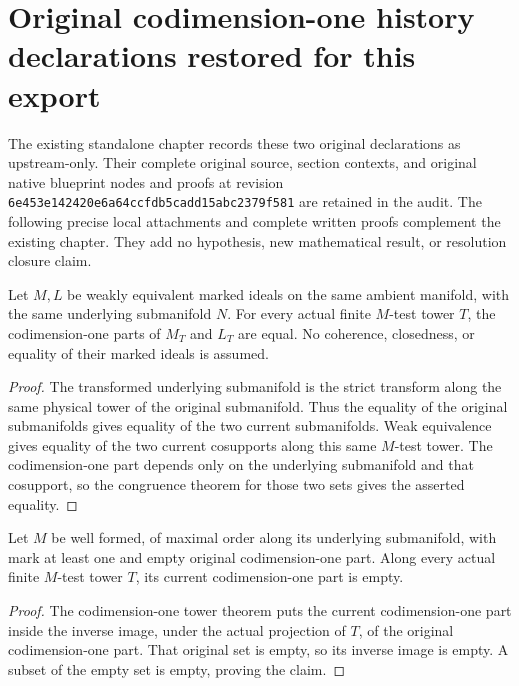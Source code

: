 \section{Original codimension-one history declarations restored for this export}

The existing standalone chapter records these two original declarations as
upstream-only. Their complete original source, section contexts, and original
native blueprint nodes and proofs at revision
\texttt{6e453e142420e6a64ccfdb5cadd15abc2379f581} are retained in the audit.
The following precise local attachments and complete written proofs complement
the existing chapter. They add no hypothesis, new mathematical result, or
resolution closure claim.

\begin{lemma}
\label{hir:additive-export-codim-equivalence-history}
Let $M,L$ be weakly equivalent marked ideals on the same ambient manifold,
with the same underlying submanifold $N$. For every actual finite $M$-test
tower $T$, the codimension-one parts of $M_T$ and $L_T$ are equal.
No coherence, closedness, or equality of their marked ideals is assumed.
\end{lemma}
\begin{proof}
The transformed underlying submanifold is the strict transform along the
same physical tower of the original submanifold. Thus the equality of the
original submanifolds gives equality of the two current submanifolds.
Weak equivalence gives equality of the two current cosupports along this
same $M$-test tower. The codimension-one part depends only on the underlying
submanifold and that cosupport, so the congruence theorem for those two sets
gives the asserted equality.
\end{proof}

\begin{lemma}
\label{hir:additive-export-codim-empty-history}
Let $M$ be well formed, of maximal order along its underlying submanifold,
with mark at least one and empty original codimension-one part. Along every
actual finite $M$-test tower $T$, its current codimension-one part is empty.
\end{lemma}
\begin{proof}
The codimension-one tower theorem puts the current codimension-one part
inside the inverse image, under the actual projection of $T$, of the
original codimension-one part. That original set is empty, so its inverse
image is empty. A subset of the empty set is empty, proving the claim.
\end{proof}
